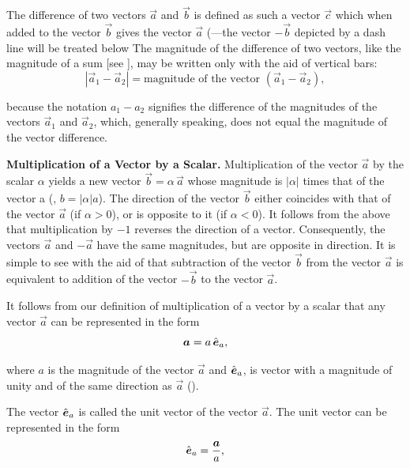 The difference of two vectors $\vec{a}$ and $\vec{b}$ is defined as such a vector $\vec{c}$ which when added to the vector $\vec{b}$ gives the vector $\vec{a}$ (---the vector $-\vec{b}$ depicted by a dash line will be treated below The magnitude of the difference of two vectors, like the magnitude of a sum [see ], may be written only with the aid of vertical bars:
\vspace{-12pt}
\begin{equation}\label{eq:1_2}
|\vec{a}_1 - \vec{a}_2| = \text{magnitude of the vector } (\vec{a}_1 - \vec{a}_2),
\end{equation}

\noindent
because the notation $a_1-a_2$ signifies the difference of the magnitudes of the vectors $\vec{a}_1$ and $\vec{a}_2$, which, generally speaking, does not equal the magnitude of the vector difference.

\textbf{Multiplication of a Vector by a Scalar.} Multiplication of the vector $\vec{a}$ by the scalar $\alpha$ yields a new vector $\vec{b}=\alpha\,\vec{a}$ whose magnitude is $|\alpha|$ times that of the vector a (\ie, $b=|\alpha|a$). The direction of the vector $\vec{b}$ either coincides with that of the vector $\vec{a}$ (if $\alpha>0$), or is opposite to it (if $\alpha<0$). It follows from the above that multiplication by $-1$ reverses the direction of a vector. Consequently, the vectors $\vec{a}$ and $-\vec{a}$ have the same magnitudes, but are opposite in direction. It is simple to see with the aid of   that subtraction of the vector $\vec{b}$ from the vector $\vec{a}$ is equivalent to addition of the vector $-\vec{b}$ to the vector $\vec{a}$.

It follows from our definition of multiplication of a vector by a scalar that any vector $\vec{a}$ can be represented in the form
\begin{equation}\label{eq:1_3}
\boldsymbol{a} = a\,\hat{\boldsymbol{e}}_{a},
\end{equation}

\noindent
where $a$ is the magnitude of the vector $\vec{a}$ and $\hat{\boldsymbol{e}}_{a}$, is vector with a magnitude of unity and of the same direction as $\vec{a}$ ().

The vector $\hat{\boldsymbol{e}}_{a}$ is called the unit vector of the vector $\vec{a}$. The unit vector can be represented in the form
\begin{equation}\label{eq:1_4}
\hat{\boldsymbol{e}}_{a} = \frac{\boldsymbol{a}}{a},
\end{equation}


